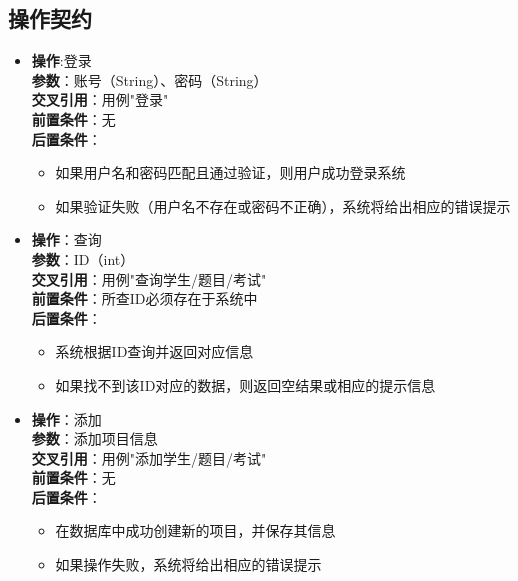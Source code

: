 \documentclass{article}
\begin{document}
\subsection{操作契约}
\begin{itemize}
    \item \textbf{操作}:登录\\
        \textbf{参数}：账号（String）、密码（String）\\
        \textbf{交叉引用}：用例"登录"\\
        \textbf{前置条件}：无\\
        \textbf{后置条件}：
        \begin{itemize}
            \item 如果用户名和密码匹配且通过验证，则用户成功登录系统
            \item 如果验证失败（用户名不存在或密码不正确），系统将给出相应的错误提示
        \end{itemize}
    \item \textbf{操作}：查询\\
        \textbf{参数}：ID（int）\\
        \textbf{交叉引用}：用例"查询学生/题目/考试"\\
        \textbf{前置条件}：所查ID必须存在于系统中\\
        \textbf{后置条件}：
        \begin{itemize}
            \item 系统根据ID查询并返回对应信息
            \item 如果找不到该ID对应的数据，则返回空结果或相应的提示信息
        \end{itemize}
    \item \textbf{操作}：添加\\
        \textbf{参数}：添加项目信息\\
        \textbf{交叉引用}：用例"添加学生/题目/考试"\\
        \textbf{前置条件}：无\\
        \textbf{后置条件}：
        \begin{itemize}
            \item 在数据库中成功创建新的项目，并保存其信息
            \item 如果操作失败，系统将给出相应的错误提示
        \end{itemize}
\end{itemize}
\end{document}
